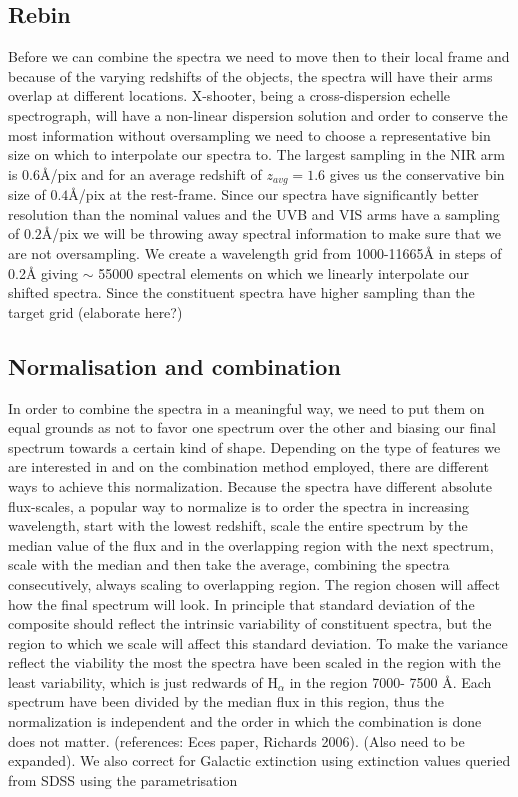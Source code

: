 \documentclass[iop]{emulateapj}
\begin{document}
\subsection{Rebin}
Before we can combine the spectra we need to move then to their local frame and because of the varying redshifts of the objects, the spectra will have their arms overlap at different locations. X-shooter, being a cross-dispersion echelle spectrograph, will have a non-linear dispersion solution and order to conserve the most information without oversampling we need to choose a representative bin size on which to interpolate our spectra to. The largest sampling in the NIR arm is $0.6$\r{A}/pix and for an average redshift of $z_{avg} = 1.6$ gives us the conservative bin size of $0.4$\r{A}/pix at the rest-frame. Since our spectra have significantly better resolution than the nominal values and the UVB and VIS arms have a sampling of $0.2$\r{A}/pix we will be throwing away spectral information to make sure that we are not oversampling. We create a wavelength grid from 1000-11665\r{A} in steps of 0.2\r{A} giving $\sim$ 55000 spectral elements on which we linearly interpolate our shifted spectra. Since the constituent spectra have higher sampling than the target grid (elaborate here?)

\subsection{Normalisation and combination}
In order to combine the spectra in a meaningful way, we need to put them on equal grounds as not to favor one spectrum over the other and biasing our final spectrum towards a certain kind of shape. Depending on the type of features we are interested in and on the combination method employed, there are different ways to achieve this normalization. Because the spectra have different absolute flux-scales, a popular way to normalize is to order the spectra in increasing wavelength, start with the lowest redshift, scale the entire spectrum by the median value of the flux and in the overlapping region with the next spectrum, scale with the median and then take the average, combining the spectra consecutively, always scaling to overlapping region. The region chosen will affect how the final spectrum will look. In principle that standard deviation of the composite should reflect the intrinsic variability of constituent spectra, but the region to which we scale will affect this standard deviation. To make the variance reflect the viability the most the spectra have been scaled in the region with the least variability, which is just redwards of H$_\alpha$ in the region 7000- 7500 \r{A}. Each spectrum have been divided by the median flux in this region, thus the normalization is independent and the order in which the combination is done does not matter. (references: Eces paper, Richards 2006). (Also need to be expanded). We also correct for Galactic extinction using extinction values queried from SDSS using the parametrisation 
\end{document}
